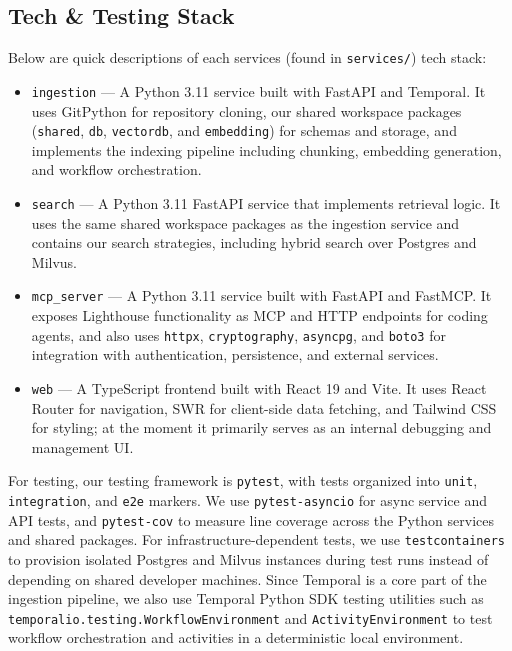 \documentclass[a4paper,12pt]{article}
\begin{document}
\subsection{Tech \& Testing Stack}
Below are quick descriptions of each services (found in \texttt{services/}) tech stack:
\begin{itemize}
  \item \texttt{ingestion} --- A Python 3.11 service built with FastAPI and Temporal.
    It uses GitPython for repository cloning, our shared workspace packages
    (\texttt{shared}, \texttt{db}, \texttt{vectordb}, and \texttt{embedding}) for
    schemas and storage, and implements the indexing pipeline including chunking,
    embedding generation, and workflow orchestration.
  \item \texttt{search} --- A Python 3.11 FastAPI service that implements retrieval
    logic. It uses the same shared workspace packages as the ingestion service and
    contains our search strategies, including hybrid search over Postgres and Milvus.
  \item \texttt{mcp\_server} --- A Python 3.11 service built with FastAPI and
    FastMCP. It exposes Lighthouse functionality as MCP and HTTP endpoints for coding
    agents, and also uses \texttt{httpx}, \texttt{cryptography}, \texttt{asyncpg},
    and \texttt{boto3} for integration with authentication, persistence, and external
    services.
  \item \texttt{web} --- A TypeScript frontend built with React 19 and Vite. It uses
    React Router for navigation, SWR for client-side data fetching, and Tailwind CSS
    for styling; at the moment it primarily serves as an internal debugging and
    management UI.
\end{itemize}

For testing, our testing framework is \texttt{pytest}, with tests organized
into \texttt{unit}, \texttt{integration}, and \texttt{e2e} markers. We use
\texttt{pytest-asyncio} for async service and API tests, and \texttt{pytest-cov} to
measure line coverage across the Python services and shared packages. For
infrastructure-dependent tests, we use \texttt{testcontainers} to provision isolated
Postgres and Milvus instances during test runs instead of depending on shared
developer machines. Since Temporal is a core part of the ingestion pipeline, we also
use Temporal Python SDK testing utilities such as
\texttt{temporalio.testing.WorkflowEnvironment} and
\texttt{ActivityEnvironment} to test workflow orchestration and activities in a
deterministic local environment.
\end{document}
